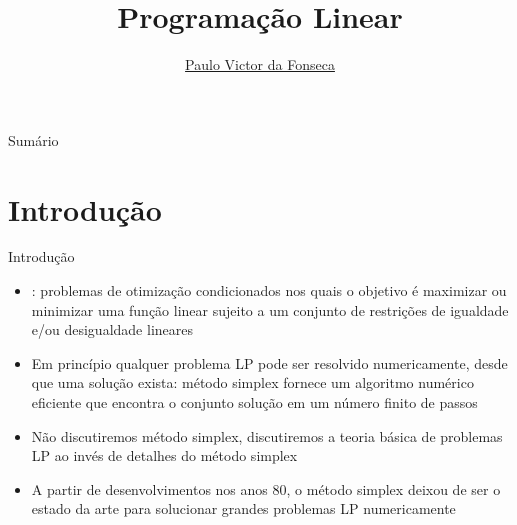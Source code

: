 \documentclass[10pt]{beamer}
\title[]{Programação Linear}
\author[]{\href{https://pvfonseca.github.io/}{Paulo Victor da Fonseca}}
\date{}
\begin{document}
\begin{frame}[plain]
\end{frame}

\begin{frame}{Sumário}
    \tableofcontents
\end{frame}

\section{Introdução}
\begin{frame}{Introdução}
    \begin{itemize}
        \item {}: problemas de otimização condicionados nos quais o objetivo é maximizar ou minimizar uma função linear sujeito a um conjunto de restrições de igualdade e/ou desigualdade lineares\bigskip
        \item Em princípio qualquer problema LP pode ser resolvido numericamente, desde que uma solução exista: método simplex fornece um algoritmo numérico eficiente que encontra o conjunto solução em um número finito de passos\bigskip
        \item Não discutiremos método simplex, discutiremos a teoria básica de problemas LP ao invés de detalhes do método simplex\bigskip
        \item A partir de desenvolvimentos nos anos 80, o método simplex deixou de ser o estado da arte para solucionar grandes problemas LP numericamente
    \end{itemize}
\end{frame}
\end{document}
